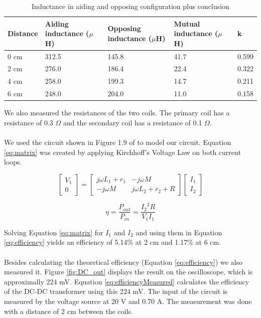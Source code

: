 \documentclass[final]{scrreprt} %
\begin{document}
\begin{table} [h]
\begin{center}
	\begin{tabular}{ l | l | l | l | l }
	Distance & Aiding inductance ($\mu$H) & Opposing inductance ($\mu$H) & Mutual inductance ($\mu$H) & k \\ \hline
  	0 cm & 312.5 & 145.8 & 41.7 & 0.599 \\
	2 cm & 276.0 & 186.4 & 22.4 & 0.322 \\
	4 cm & 258.0 & 199.3 & 14.7 & 0.211 \\
	6 cm & 248.0 & 204.0 & 11.0 & 0.158 \\
	\end{tabular}
	\caption{Inductance in aiding and opposing configuration plus conclusion}
	\label{tab:inductances}
\end{center}
\end{table}

We also measured the resistances of the two coils. The primary coil has a resistance of 0.3 $\Omega$ and the secondary coil has a resistance of 0.1 $\Omega$.
\\ \\
We used the circuit shown in Figure 1.9 of \cite{epo4-manual} to model our circuit. Equation \ref{eq:matrix} was created by applying Kirchhoff's Voltage Law on both current loops.

\begin{equation}
	\begin{bmatrix}
		V_1 \\
		0
	\end{bmatrix} =
	\begin{bmatrix}
		j \omega L_1 + r_1 & -j \omega M \\
		-j \omega M & j \omega L_2 + r_2 + R
	\end{bmatrix}
	\begin{bmatrix}
		I_1 \\
		I_2
	\end{bmatrix}
	\label{eq:matrix}
\end{equation}

\begin{equation}
	\eta = \frac{P_{out}}{P_{in}} = \frac{{I_2}^2 R}{V_1 I_1}
	\label{eq:efficiency}
\end{equation}

Solving Equation \ref{eq:matrix} for $I_1$ and $I_2$ and using them in Equation \ref{eq:efficiency} yields an efficiency of 5.14\% at 2 cm and 1.17\% at 6 cm.
\\ \\
Besides calculating the theoretical efficiency (Equation \ref{eq:efficiency}) we also measured it. Figure \ref{fig:DC_out} displays the result on the oscilloscope, which is approximally 224 mV. Equation \ref{eq:efficiencyMeasured} calculates the efficiency of the DC-DC transformer using this 224 mV. The input of the circuit is measured by the voltage source at 20 V and 0.70 A. The measurement was done with a distance of 2 cm between the coils.
\end{document}

